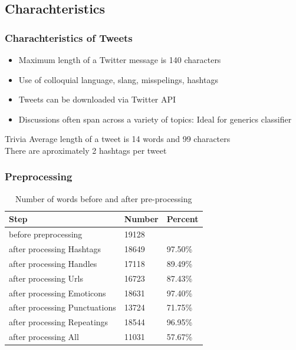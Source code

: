 \documentclass{beamer}
\begin{document}
\subsection{Charachteristics}

\begin{frame}
\frametitle{Charachteristics of Tweets}
\begin{itemize}
\item Maximum length of a Twitter message is 140 characters
\item Use of colloquial language, slang, misspelings, hashtags
\item Tweets can be downloaded via Twitter API
\item Discussions often span across a variety of topics:
		Ideal for generics classifier
\end{itemize}

\begin{block}{Trivia}
Average length of a tweet is 14 words and 99 characters \\
There are aproximately 2 hashtags per tweet
\end{block}

\end{frame}


\begin{frame}
\frametitle{Preprocessing}
\begin{table}[h]
\centering
	\begin{tabular}{ l l l }
	\toprule
	\textbf{Step} & \textbf{Number} & \textbf{Percent}	\\
	\midrule
	before preprocessing & 19128 & \\
	\midrule
	after processing Hashtags & 18649 & 97.50\% \\
	after processing Handles & 17118 & 89.49\% \\
	after processing Urls & 16723 & 87.43\% \\
	after processing Emoticons & 18631 & 97.40\% \\
	after processing Punctuations & 13724 & 71.75\% \\
	after processing Repeatings & 18544 & 96.95\% \\
	\bottomrule
	after processing All & 11031 & 57.67\% \\
	\bottomrule
	\end{tabular}
\caption{Number of words before and after pre-processing}
\label{table:preproc_numwords}
\end{table}
\end{frame}
\end{document}
